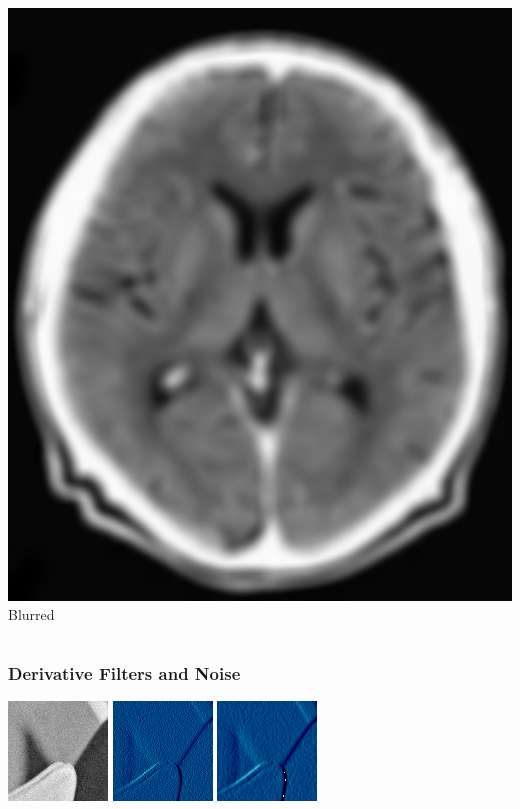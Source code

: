 \begin{frame}
\begin{columns}[onlytextwidth]
\begin{column}{0.5\textwidth}
            \includegraphics[height=0.8\textheight]{img/brain_gauss}\\Blurred
        \end{column}
    \end{columns}
\end{frame}



\begin{frame}
	\frametitle{Derivative Filters and Noise}
	\includegraphics{img/lenadetailnoise}
	 \includegraphics{img/nonsobel}
	 \includegraphics{img/withsobel}
\end{frame}

